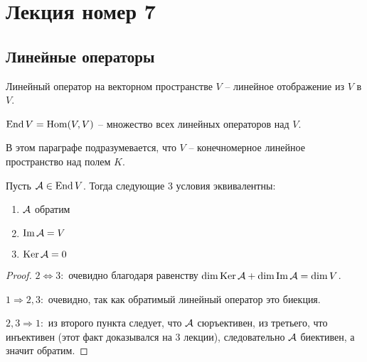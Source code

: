 \section{Лекция номер 7}
\subsection{Линейные операторы}
\begin{conj}
    Линейный оператор на векторном пространстве $V$ -- линейное отображение из $V$ в $V$.

    $\operatorname{End} V = \operatorname{Hom}(V, V)$ -- множество всех линейных операторов над $V$.
\end{conj}

В этом параграфе подразумевается, что $V$ -- конечномерное линейное пространство над полем $K$.

\begin{theorem}
    Пусть $\mathcal{A} \in \operatorname{End} V$. Тогда следующие 3 условия эквивалентны:
    \begin{enumerate}
        \item $\mathcal{A}$ обратим
        \item $\operatorname{Im} \mathcal{A} = V$
        \item $\operatorname{Ker} \mathcal{A} = 0$
    \end{enumerate}
\end{theorem}
\begin{proof} \quad 

    \quad$2 \Leftrightarrow 3:$ очевидно благодаря равенству $\dim \operatorname{Ker} \mathcal{A} + \dim \operatorname{Im} \mathcal{A} = \dim V$.
    
    \quad$1 \Rightarrow 2, 3:$ очевидно, так как обратимый линейный оператор это биекция.

    \quad$2, 3 \Rightarrow 1:$ из второго пункта следует, что $\mathcal{A}$ сюръективен, из третьего, что инъективен (этот факт доказывался на 3 лекции), следовательно $\mathcal{A}$ биективен, а значит обратим.
\end{proof}

